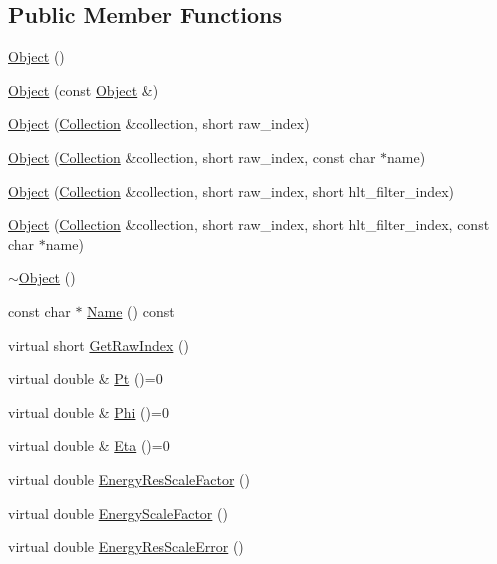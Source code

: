 \subsection*{Public Member Functions}
\begin{DoxyCompactItemize}
\item 
\hyperlink{class_object_a40860402e64d8008fb42329df7097cdb}{Object} ()
\item 
\hyperlink{class_object_af3b5cd7a9a24ddde484344200cf83281}{Object} (const \hyperlink{class_object}{Object} \&)
\item 
\hyperlink{class_object_a4cab32d7c391abd44858b62a291a63af}{Object} (\hyperlink{class_collection}{Collection} \&collection, short raw\+\_\+index)
\item 
\hyperlink{class_object_ab53a90984c2f5ce5c56844729e2a9423}{Object} (\hyperlink{class_collection}{Collection} \&collection, short raw\+\_\+index, const char $\ast$name)
\item 
\hyperlink{class_object_a0e5c30a0657fe9466ac0929bc9460a01}{Object} (\hyperlink{class_collection}{Collection} \&collection, short raw\+\_\+index, short hlt\+\_\+filter\+\_\+index)
\item 
\hyperlink{class_object_ae50594e498a111e905387e0313c801f4}{Object} (\hyperlink{class_collection}{Collection} \&collection, short raw\+\_\+index, short hlt\+\_\+filter\+\_\+index, const char $\ast$name)
\item 
\hyperlink{class_object_ae8f5483f459e46687bd01e6f9977afd3}{$\sim$\+Object} ()
\item 
const char $\ast$ \hyperlink{class_object_a57442be9a5695f873a22787a107ec01b}{Name} () const 
\item 
virtual short \hyperlink{class_object_a6c5f158e839949047e4cb14489aae4ca}{Get\+Raw\+Index} ()
\item 
virtual double \& \hyperlink{class_object_ac280f2330a4bd359404841431bd46f2e}{Pt} ()=0
\item 
virtual double \& \hyperlink{class_object_ab8fa3bfbd16c2b6c420ec113fbc2a0e4}{Phi} ()=0
\item 
virtual double \& \hyperlink{class_object_a3760d2b4b0723118234370675654d46a}{Eta} ()=0
\item 
virtual double \hyperlink{class_object_abf0816d94dbf5512710b160f54779c98}{Energy\+Res\+Scale\+Factor} ()
\item 
virtual double \hyperlink{class_object_ae1afc1bad2f56db046023a9776eba93f}{Energy\+Scale\+Factor} ()
\item 
virtual double \hyperlink{class_object_a492c12bfcde7d1a7c36722cfc7977e92}{Energy\+Res\+Scale\+Error} ()

\end{DoxyCompactItemize}
